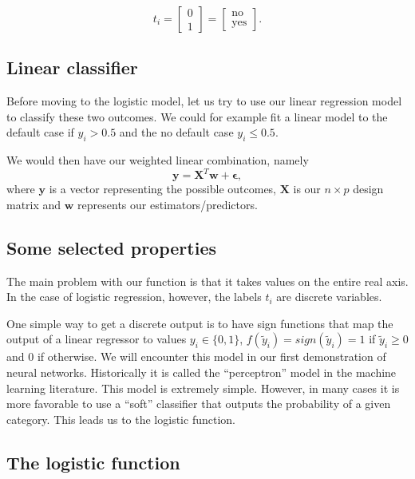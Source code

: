 \documentclass[%
oneside,                 %
final,                   %
10pt]{article}
\begin{document}
\[
t_i = \begin{bmatrix} 0 \\  1 \end{bmatrix}
= \begin{bmatrix} \mathrm{no}\\  \mathrm{yes} \end{bmatrix}.
\]



\subsection{Linear classifier}

Before moving to the logistic model, let us try to use our linear
regression model to classify these two outcomes. We could for example
fit a linear model to the default case if $y_i > 0.5$ and the no
default case $y_i \leq 0.5$.

We would then have our 
weighted linear combination, namely 
\begin{equation}
\boldsymbol{y} = \boldsymbol{X}^T\boldsymbol{w} +  \boldsymbol{\epsilon},
\end{equation}
where $\boldsymbol{y}$ is a vector representing the possible outcomes, $\boldsymbol{X}$ is our
$n\times p$ design matrix and $\boldsymbol{w}$ represents our estimators/predictors.

\subsection{Some selected properties}

The main problem with our function is that it takes values on the
entire real axis. In the case of logistic regression, however, the
labels $t_i$ are discrete variables. 

One simple way to get a discrete output is to have sign
functions that map the output of a linear regressor to values $y_i \in \{ 0, 1 \}$,
$f(\tilde{y}_i)=sign(\tilde{y}_i)=1$ if $\tilde{y}_i\ge 0$ and 0 if otherwise. 
We will encounter this model in our first demonstration of neural networks. Historically it is called the ``perceptron'' model in the machine learning
literature. This model is extremely simple. However, in many cases it is more
favorable to use a ``soft'' classifier that outputs
the probability of a given category. This leads us to the logistic function.


\subsection{The logistic function}
\end{document}
